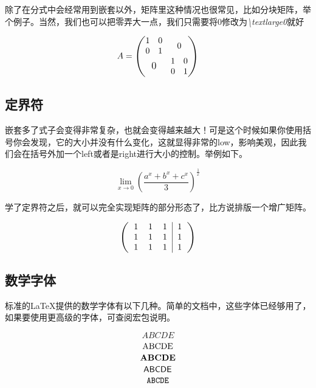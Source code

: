 除了在分式中会经常用到嵌套以外，矩阵里这种情况也很常见，比如分块矩阵，举个例子。当然，我们也可以把零弄大一点，我们只需要将0修改为\emph{\textbackslash text{large{0}}}就好
\begin{codeshow}
\[
A=\begin{pmatrix}
\begin{matrix}
1 & 0 \\
0 & 1
\end{matrix} & 0 \\
\text{\large{0}} & \begin{matrix}
1 & 0 \\
0 & 1
\end{matrix}
\end{pmatrix}
\]
\end{codeshow}

\subsection{定界符}
嵌套多了式子会变得非常复杂，也就会变得越来越大！可是这个时候如果你使用括号你会发现，它的大小并没有什么变化，这就显得非常的low，影响美观，因此我们会在括号外加一个left或者是right进行大小的控制。举例如下。
\begin{codeshow}
\[
\lim\limits_{x\to 0}\left(\frac
{a^{x}+b^{x}+c^{x}}{3}\right)
^{\tfrac{1}{x}}
\]
\end{codeshow}

学了定界符之后，就可以完全实现矩阵的部分形态了，比方说排版一个增广矩阵。

\begin{codeshow}
\[
\left(
\begin{tabular}{ccc|c}
1 & 1 & 1 & 1 \\
1 & 1 & 1 & 1 \\
1 & 1 & 1 & 1 
\end{tabular}
\right)
\]
\end{codeshow}

\subsection{数学字体}
标准的\LaTeX 提供的数学字体有以下几种。简单的文档中，这些字体已经够用了，如果要使用更高级的字体，可查阅\CTeX 宏包说明。
\begin{codeshow}
\[
\mathit{ABCDE}\]
\[
\mathrm{ABCDE}\\\]
\[
\mathbf{ABCDE}\\\]
\[
\mathsf{ABCDE}\\\]
\[
\mathtt{ABCDE}\\\]
\end{codeshow}


